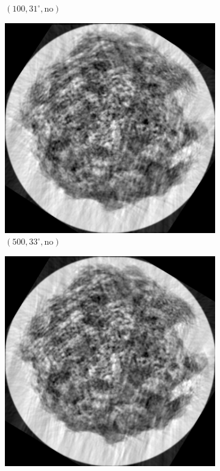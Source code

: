 \documentclass[a4paper, landscape]{article}
\begin{document}
\begin{figure}[H]
\begin{subfigure}{0.13\linewidth}
		\caption{$(100, 31^\circ, \text{no})$}
	\end{subfigure}
	\begin{subfigure}{0.13\linewidth}
		\centering
		\includegraphics[width=\linewidth]{results/cryoem, N = 500 and rotated by angle = 33.png}
		\caption{$(500, 33^\circ, \text{no})$}
	\end{subfigure}
	\begin{subfigure}{0.13\linewidth}
		\centering
		\includegraphics[width=\linewidth]{results/cryoem, N = 1000 and rotated by angle = 31.png}

\end{subfigure}
\end{figure}
\end{document}
